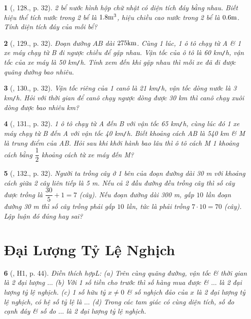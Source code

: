 \documentclass{article}
\newtheorem{baitoan}{}
\begin{document}
\begin{baitoan}[\cite{Tuyen_Toan_7}, 128., p. 32]
	2 bể nước hình hộp chữ nhật có diện tích đáy bằng nhau. Biết hiệu thể tích nước trong 2 bể là $\rm1.8m^3$, hiệu chiều cao nước trong 2 bể là $\rm0.6m$. Tính diện tích đáy của mỗi bể?
\end{baitoan}

\begin{baitoan}[\cite{Tuyen_Toan_7}, 129., p. 32]
	Đoạn đường $AB$ dài $\rm275km$. Cùng 1 lúc, 1 ô tô chạy từ A \& 1 xe máy chạy từ B đi ngược chiều để gặp nhau. Vận tốc của ô tô là {\rm60 km{\tt/}h}, vận tốc của xe máy là {\rm50 km{\tt/}h}. Tính xem đến khi gặp nhau thì mỗi xe đã đi được quãng đường bao nhiêu.
\end{baitoan}

\begin{baitoan}[\cite{Tuyen_Toan_7}, 130., p. 32]
	Vận tốc riêng của 1 canô là {\rm21 km{\tt/}h}, vận tốc dòng nước là {\rm3 km{\tt/}h}. Hỏi với thời gian để canô chạy ngược dòng được {\rm30 km} thì canô chạy xuôi dòng được bao nhiêu {\rm km}?
\end{baitoan}

\begin{baitoan}[\cite{Tuyen_Toan_7}, 131., p. 32]
	1 ô tô chạy từ A đến B với vận tốc {\rm65 km{\tt/}h}, cùng lúc đó 1 xe máy chạy từ B đến A với vận tốc {\rm40 km{\tt/}h}. Biết khoảng cách AB là {\rm540 km} \& M là trung điểm của AB. Hỏi sau khi khởi hành bao lâu thì ô tô cách M 1 khoảng cách bằng $\dfrac{1}{2}$ khoảng cách từ xe máy đến M?
\end{baitoan}

\begin{baitoan}[\cite{Tuyen_Toan_7}, 132., p. 32]
	Người ta trồng cây ở 1 bên của đoạn đường dài {\rm30 m} với khoảng cách giữa 2 cây liên tiếp là {\rm5 m}. Nếu cả 2 đầu đường đều trồng cây thì số cây được trồng là $\dfrac{30}{5} + 1 = 7$ (cây). Nếu đoạn đường dài {\rm300 m}, gấp $10$ lần đoạn đường {\rm30 m} thì số cây trồng phải gấp $10$ lần, tức là phải trồng $7\cdot 10 = 70$ (cây). Lập luận đó đúng hay sai?
\end{baitoan}


\section{Đại Lượng Tỷ Lệ Nghịch}

\begin{baitoan}[\cite{Binh_boi_duong_Toan_7_tap_1}, H1, p. 44]
	Điền thích hợpL: (a) Trên cùng quãng đường, vận tốc \& thời gian là 2 đại lượng $\ldots$ (b) Với 1 số tiền cho trước thì số hàng mua được \& $\ldots$ là 2 đại lượng tỷ lệ nghịch. (c) 1 số hữu tỷ $x\ne0$ \& số nghịch đảo của $x$ là 2 đại lượng tỷ lệ nghịch, có hệ số tỷ lệ là $\ldots$ (d) Trong các tam giác có cùng diện tích, số đo cạnh đáy \& số đo $\ldots$ là 2 đại lượng tỷ lệ nghịch.
\end{baitoan}
\end{document}
